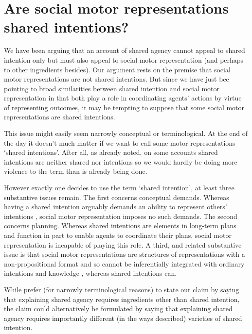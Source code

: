\documentclass[12pt,\papersize]{extarticle}
\begin{document}
\section{Are social motor representations shared intentions?}

We have been arguing that an account of shared agency cannot appeal to shared intention only  but must also appeal to  social motor representation (and perhaps to other ingredients besides).
Our argument rests on the premise that social motor representations are not shared intentions.
But since we have just bee pointing to broad similarities between shared intention and social motor representation in that both play a role in coordinating agents’ actions by virtue of representing outcomes,
it may be tempting to suppose that some social motor representations are  shared intentions.

This issue might easily seem narrowly conceptual or terminological.  
At the end of the day it doesn’t much matter if we want to call some motor representations ‘shared intentions’.  
After all, as already noted, on some accounts shared intentions are neither shared nor intentions so we would hardly be doing more violence to the term than is already being done.  

However exactly one decides to use the term `shared intention',  at least three substantive issues remain. 
The first concerns conceptual demands.
Whereas having a shared intention arguably demands an ability to represent others' intentions \citep[pp.\ *][]{Butterfill:2011fk},
social motor representation imposes no such demands.
The second concerns planning.
Whereas shared intentions are elements in long-term plans and function in part to enable agents to coordinate their plans, social motor representation is incapable of playing this role.
A third, and related substantive issue is that social motor representations are structures of representations with a non-propositional format and so cannot be inferentially integrated with ordinary intentions and knowledge \citep[pp.\ *][]{butterfill:2012_intention}, whereas shared intentions can.

While prefer (for narrowly terminological reasons) to state our claim by saying that explaining shared agency requires ingredients other than shared intention,
the claim could alternatively be formulated by saying that  explaining shared agency requires importantly different (in the ways described) varieties of shared intention.
\end{document}

